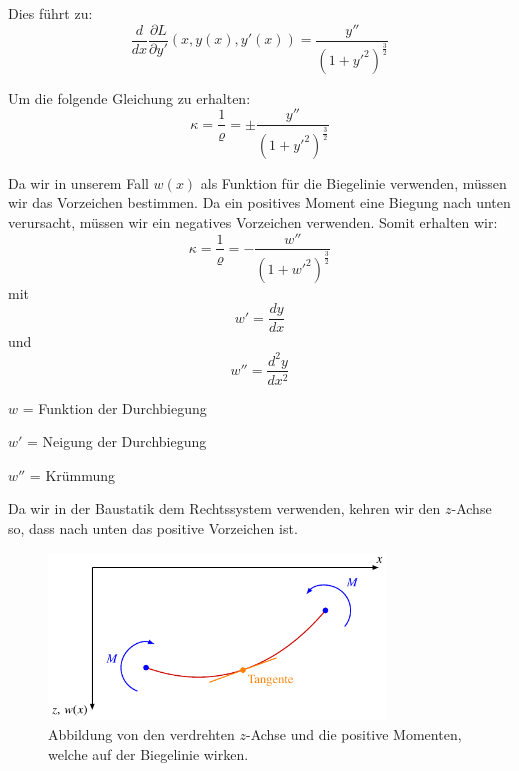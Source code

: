 Dies führt zu:
\begin{equation}
	\frac{d}{dx} \frac{\partial L}{\partial y'}(x,y(x),y'(x)) = \frac{y''}{(1 + {y'}^2)^{\frac{3}{2}}}
\end{equation}

Um die folgende Gleichung zu erhalten:
\begin{equation}
	\kappa = \frac{1}{\varrho} = \pm \frac{y''}{(1 + {y'}^2)^{\frac{3}{2}}}
\end{equation}

Da wir in unserem Fall $w(x)$ als Funktion für die Biegelinie verwenden, müssen wir das Vorzeichen bestimmen. Da ein positives Moment eine Biegung nach unten verursacht, müssen wir ein negatives Vorzeichen verwenden. Somit erhalten wir:
\begin{equation}
	\kappa=
	\frac{1}{\varrho}=
	-\frac{w''}{\left(1+{w'}^2\right)^\frac{3}{2}}
\end{equation}
mit
\begin{equation}
	w'=
	\frac{dy}{dx} 
\end{equation}
und
\begin{equation}
	w''=
	\frac{d^2y}{dx^2}
\end{equation}

$w$ = Funktion der Durchbiegung

$w'$ = Neigung der Durchbiegung

$w''$ = Krümmung

Da wir in der Baustatik dem Rechtssystem verwenden, kehren wir den $z$-Achse so, dass nach unten das positive Vorzeichen ist.
\begin{figure}
\centering
	\includegraphics[width=0.8\textwidth]{papers/balken/images/teil2/BiegungverdrehteAchsen.pdf}
\caption{Abbildung von den verdrehten $z$-Achse und die positive Momenten, welche auf der Biegelinie wirken.}
\label{fig:Abbildung von den verdrehten $z$-Achse und die positive Momenten, welche auf der Biegelinie wirken.}
\end{figure}

